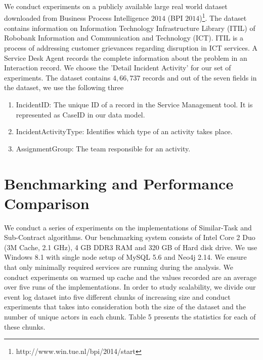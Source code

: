\documentclass[11pt]{article}
\begin{document}
{{\par{We conduct experiments on a publicly available large real world dataset downloaded from Business Process Intelligence $2014$ (BPI $2014$)\footnote{http://www.win.tue.nl/bpi/2014/start}. The dataset contains information on Information Technology Infrastructure Library (ITIL) of Robobank Information and Communication and Technology (ICT). ITIL is a process of addressing customer grievances regarding disruption in ICT services. A Service Desk Agent records the complete information about the problem in an Interaction record.  We choose the 'Detail Incident Activity' for our set of experiments. The dataset contains $4,66,737$ records and out of the seven fields  in the dataset, we use the following three}
\par{\begin{enumerate}[nolistsep]
\item Incident\textunderscore ID: The unique ID of a record in the Service Management tool. It is represented as CaseID in our data model.
\item IncidentActivity\textunderscore Type: Identifies which type of an activity takes place.
\item Assignment\textunderscore Group: The team responsible for an activity.
\end{enumerate}
}

%

\section{Benchmarking and Performance Comparison}
\par{We conduct a series of experiments on the implementations of Similar-Task and Sub-Contract algorithms. Our benchmarking system consists of Intel Core 2 Duo (3M Cache, 2.1 GHz), 4 GB DDR3 RAM and 320 GB of Hard disk drive. We use Windows 8.1 with single node setup of MySQL 5.6 and Neo4j 2.14. We ensure that only minimally required services are running during the analysis. We conduct experiments on warmed up cache and the values recorded are an average over five runs of the implementations. In order to study scalability, we divide our event log dataset into five different chunks of increasing size and conduct experiments that takes into consideration both the size of the dataset and the number of unique actors in each chunk. Table 5 presents the statistics for each of these chunks.}
}}
\end{document}

